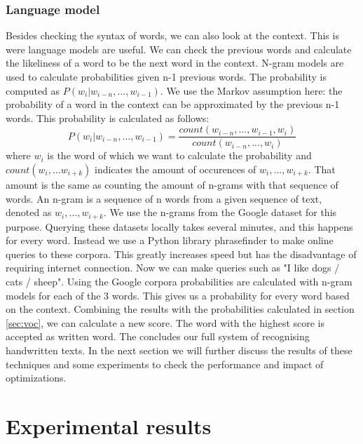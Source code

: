 \documentclass{article}
\begin{document}
\subsubsection{Language model}
\label{sec:lm}
Besides checking the syntax of words, we can also look at the context. This is were language models are useful. We can check the previous words and calculate the likeliness of a word to be the next word in the context. N-gram models are used to calculate probabilities given n-1 previous words. The probability is computed as $P(w_i | w_{i-n},...,w_{i-1})$. 
We use the Markov assumption here: the probability of a word in the context can be approximated by the previous n-1 words. This probability is calculated as follows: 
\begin{equation}
        P(w_i | w_{i-n},...,w_{i-1}) = \frac{count(w_{i-n},...,w_{i-1},w_{i})}{count(w_{i-n},...,w_i)}
\end{equation}
where $w_i$ is the word of which we want to calculate the probability and $count(w_i,...w_{i+k})$ indicates the amount of occurences of $w_i,...,w_{i+k}$. That amount is the same as counting the amount of n-grams with that sequence of words. An n-gram is a sequence of n words from a given sequence of text, denoted as $w_i,...,w_{i+k}$.
We use the n-grams from the Google dataset for this purpose. Querying these datasets locally takes several minutes, and this happens for every word. Instead we use a Python library phrasefinder to make online queries to these corpora. This greatly increases speed but has the disadvantage of requiring internet connection. 
Now we can make queries such as "I like dogs / cats / sheep". Using the Google corpora probabilities are calculated with n-gram models for each of the 3 words. This gives us a probability for every word based on the context. 
Combining the results with the probabilities calculated in section \ref{sec:voc}, we can 
calculate a new score. The word with the highest score is accepted as written word. 
The concludes our full system of recognising handwritten texts. In the next section we will further discuss the results of these techniques and some experiments to check the performance and impact of optimizations. 
\section{Experimental results}
\end{document}
